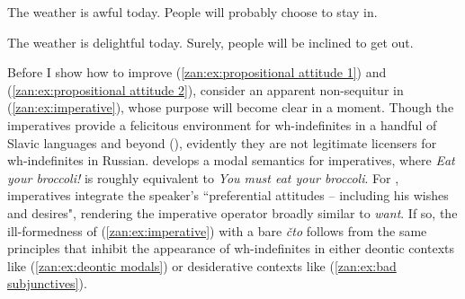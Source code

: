 \documentclass[output=paper,colorlinks,citecolor=brown]{langscibook}
\begin{document}
\ea \label{zan:ex:propositional attitude 1} The weather is awful today. People will probably choose to stay in.
\z
\z

\ea \label{zan:ex:propositional attitude 2} The weather is delightful today. Surely, people will be inclined to get out.
\z
\z

\noindent Before I show how to improve (\ref{zan:ex:propositional attitude 1}) and (\ref{zan:ex:propositional attitude 2}),  consider an apparent non-sequitur in (\ref{zan:ex:imperative}), whose purpose will become clear in a moment. Though the imperatives provide a felicitous environment for wh-indefinites in a handful of Slavic languages and beyond (\citealt{haspelmath1997indefinite}), evidently they are not legitimate licensers for wh-indefinites in Russian. \citet{kaufmann2012interpreting} develops a modal semantics for imperatives, where \textit{Eat your broccoli!} is roughly equivalent to \textit{You must eat your broccoli}. For \citet[49]{condoravdi2012imperatives}, imperatives integrate the speaker's ``preferential attitudes -- including his wishes and desires", rendering the imperative operator broadly similar to \textit{want}. If so, the ill-formedness of (\ref{zan:ex:imperative}) with a bare \textit{čto} follows from the same principles that inhibit the appearance of wh-indefinites in either deontic contexts like (\ref{zan:ex:deontic modals}) or desiderative contexts like (\ref{zan:ex:bad subjunctives}).
\end{document}
